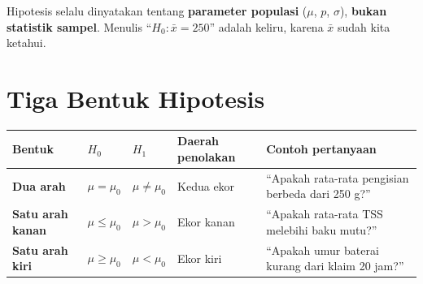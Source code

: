 \documentclass[
  indonesian,
  letterpaper,
]{book}
\newcounter{none} %
\begin{document}
\begin{tcolorbox}[enhanced jigsaw, arc=.35mm, bottomrule=.15mm, bottomtitle=1mm, breakable, colback=white, colbacktitle=quarto-callout-important-color!10!white, colframe=quarto-callout-important-color-frame, coltitle=black, left=2mm, leftrule=.75mm, opacityback=0, opacitybacktitle=0.6, rightrule=.15mm, title=\textcolor{quarto-callout-important-color}{\faExclamation}\hspace{0.5em}{Aturan penting}, titlerule=0mm, toprule=.15mm, toptitle=1mm]

Hipotesis selalu dinyatakan tentang \textbf{parameter populasi}
(\(\mu\), \(p\), \(\sigma\)), \textbf{bukan statistik sampel}. Menulis
``\(H_0: \bar{x} = 250\)'' adalah keliru, karena \(\bar{x}\) sudah kita
ketahui.

\end{tcolorbox}

\section{Tiga Bentuk Hipotesis}\label{tiga-bentuk-hipotesis}

{\def\LTcaptype{none} %
\begin{longtable}[]{@{}
  >{\raggedright\arraybackslash}p{}
  >{\centering\arraybackslash}p{}
  >{\centering\arraybackslash}p{}
  >{\raggedright\arraybackslash}p{}
  >{\raggedright\arraybackslash}p{}@{}}
\toprule\noalign{}
\begin{minipage}[b]{\linewidth}\raggedright
Bentuk
\end{minipage} & \begin{minipage}[b]{\linewidth}\centering
\(H_0\)
\end{minipage} & \begin{minipage}[b]{\linewidth}\centering
\(H_1\)
\end{minipage} & \begin{minipage}[b]{\linewidth}\raggedright
Daerah penolakan
\end{minipage} & \begin{minipage}[b]{\linewidth}\raggedright
Contoh pertanyaan
\end{minipage} \\
\midrule\noalign{}
\endhead
\bottomrule\noalign{}
\endlastfoot
\textbf{Dua arah} & \(\mu = \mu_0\) & \(\mu \neq \mu_0\) & Kedua ekor &
``Apakah rata-rata pengisian berbeda dari 250 g?'' \\
\textbf{Satu arah kanan} & \(\mu \leq \mu_0\) & \(\mu > \mu_0\) & Ekor
kanan & ``Apakah rata-rata TSS melebihi baku mutu?'' \\
\textbf{Satu arah kiri} & \(\mu \geq \mu_0\) & \(\mu < \mu_0\) & Ekor
kiri & ``Apakah umur baterai kurang dari klaim 20 jam?'' \\
\end{longtable}
}
\end{document}
